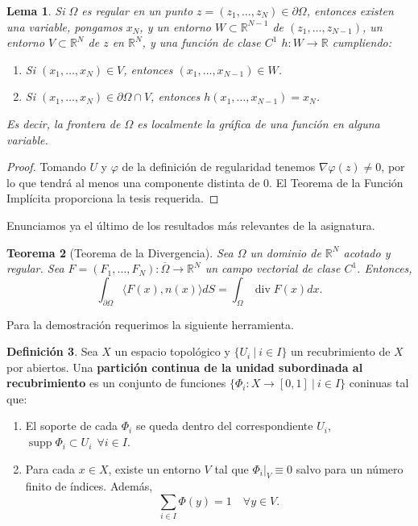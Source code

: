 \documentclass[12pt,spanish]{article}
\newtheorem{theorem}{Teorema}[section]
\newtheorem{lemma}[theorem]{Lema}
\theoremstyle{definition}
\newtheorem{definition}[theorem]{Definici\'on}
\theoremstyle{remark}
\begin{document}
\begin{lemma}
	Si $\Omega$ es regular en un punto $z=(z_1,\ldots,z_N)\in\partial\Omega$, entonces existen una variable, pongamos $x_N$, y un entorno $W\subset\mathbb{R}^{N-1}$ de $(z_1,\ldots,z_{N-1})$, un entorno $V\subset\mathbb{R}^N$ de $z$ en $\mathbb{R}^N$, y una función de clase $C^1$ $h:W\rightarrow \mathbb{R}$ cumpliendo:
	\begin{enumerate}[$(a)$]
		\item Si $(x_1,\ldots,x_N)\in V$, entonces $(x_1,\ldots,x_{N-1})\in W$.
		\item Si $(x_1,\ldots,x_N)\in \partial\Omega\cap V$, entonces $h(x_1,\ldots,x_{N-1})=x_N$.
	\end{enumerate}
Es decir, la frontera de $\Omega$ es localmente la gráfica de una función en alguna variable.
\end{lemma}

\begin{proof}
	Tomando $U$ y $\varphi$ de la definición de regularidad tenemos $\nabla\varphi(z)\neq 0$, por lo que tendrá al menos una componente distinta de 0. El Teorema de la Función Implícita proporciona la tesis requerida.
\end{proof}

Enunciamos ya el último de los resultados más relevantes de la asignatura.

\begin{theorem}[Teorema de la Divergencia]
	Sea $\Omega$ un dominio de $\mathbb{R}^N$ acotado y regular. Sea $F=(F_1,\ldots,F_N):\overline{\Omega}\rightarrow\mathbb{R}^N$ un campo vectorial de clase $C^1$.
	Entonces,
	\[\int_{\partial\Omega}\langle F(x),n(x)\rangle dS=\int_\Omega \operatorname{div}F(x)dx.\]
\end{theorem}

Para la demostración requerimos la siguiente herramienta.

\begin{definition}
	Sea $X$ un espacio topológico y $\{U_i \ | \ i \in I\}$ un recubrimiento de $X$ por abiertos. Una \textbf{partición continua de la unidad subordinada al recubrimiento} es un conjunto de funciones $\{\Phi_i:X\rightarrow[0,1] \ | \ i\in I\}$ coninuas tal que:
	\begin{enumerate}[$(a)$]
		\item El soporte de cada $\Phi_i$ se queda dentro del correspondiente $U_i$, $\operatorname{supp}\Phi_i\subset U_i\ \ \forall i\in I$.
		\item Para cada $x\in X$, existe un entorno $V$ tal que $\Phi_i|_V\equiv 0$ salvo para un número finito de índices. Además, \[
		\sum_{i\in I}\Phi(y)=1\quad\forall y\in V.\]
	\end{enumerate}
\end{definition}
\end{document}
